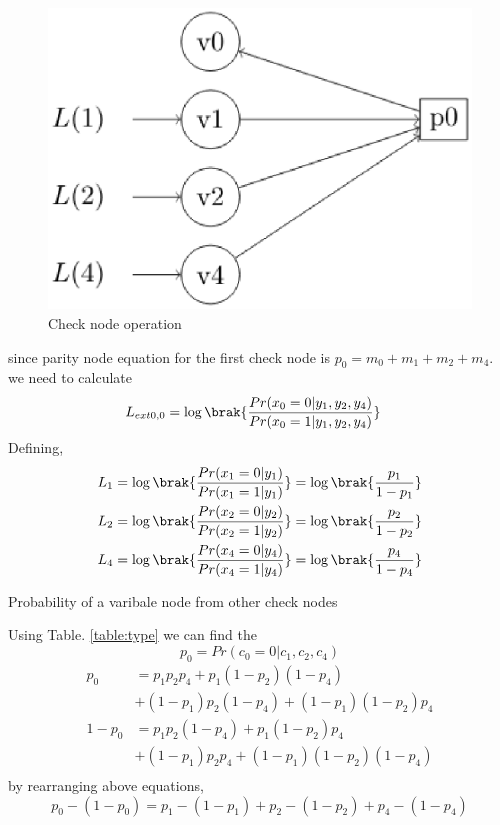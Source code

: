 \documentclass[journal,12pt,twocolumn]{IEEEtran}
\begin{document}
\begin{enumerate}
\begin{figure}[!ht]
\begin{center}
\includegraphics[width=\columnwidth]{./figs/checkope}
\end{center}
\caption{Check node operation}
\label{fig : check}
\end{figure}
since parity node equation for the first check node is $p_0=m_0+m_1+m_2+m_4$. we need to calculate
\begin{align}
L_{ext0,0} &= \log \brak{\frac{Pr(x_0 =0 | y_1,y_2,y_4)}{Pr(x_0 =1| y_1,y_2,y_4)}}
\end{align}
Defining,
\begin{align}
L_1 &= \log \brak{\frac{Pr(x_1 =0 | y_1)}{Pr(x_1 =1| y_1)}} = \log \brak{\frac{p_1}{1-p_1}} \\
L_2 &= \log \brak{\frac{Pr(x_2 =0 | y_2)}{Pr(x_2 =1| y_2)}}=\log \brak{\frac{p_2}{1-p_2}} \\
L_4 &= \log \brak{\frac{Pr(x_4 =0 | y_4)}{Pr(x_4 =1| y_4)}}= \log \brak{\frac{p_4}{1-p_4}} \\
\end{align}
\begin{table}[!ht]
\begin{center}
{\tiny

}
\end{center}
\caption{Probability of a varibale node from other check nodes}
\label{table:type}
\end{table}
Using Table. \ref{table:type} we can find the 
\begin{equation}
p_0=Pr(c_0=0|c_1,c_2,c_4)
\end{equation}
\begin{align*}
p_0 &= p_1p_2p_4 + p_1(1-p_2)(1-p_4)\\
&+(1-p_1)p_2(1-p_4)
+(1-p_1)(1-p_2)p_4\\
1-p_0 &=p_1p_2(1-p_4) + p_1(1-p_2)p_4\\
&+(1-p_1)p_2p_4+(1-p_1)(1-p_2)(1-p_4)\\
\end{align*}
by rearranging above equations,
\begin{equation}
p_0 - (1-p_0) = p_1 -(1-p_1) + p_2 - (1-p_2) + p_4 -(1- p_4)
\end{equation}


\end{enumerate}
\end{document}
